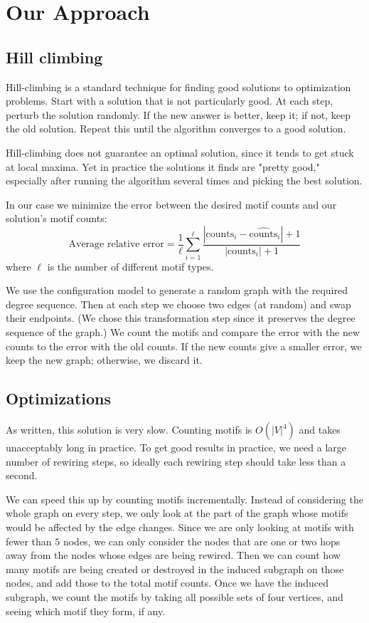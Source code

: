 \section{Our Approach}
\label{sec:approach}

\subsection{Hill climbing}
Hill-climbing is a standard technique for finding good solutions to optimization problems.  Start with a solution that is not particularly good.  At each step, perturb the solution randomly.  If the new answer is better, keep it; if not, keep the old solution.  Repeat this until the algorithm converges to a good solution.

Hill-climbing does not guarantee an optimal solution, since it tends to get stuck at local maxima.  Yet in practice the solutions it finds are "pretty good," especially after running the algorithm several times and picking the best solution.

In our case we minimize the error between the desired motif counts and our solution's motif counts: $$\mbox{Average relative error} = \frac{1}{\ell} \sum_{i = 1}^{\ell} \frac{|\mbox{counts}_i - \widehat{\mbox{counts}}_i| + 1}{|\mbox{counts}_i| + 1}$$ where $\ell$ is the number of different motif types.

We use the configuration model to generate a random graph with the required degree sequence.  Then at each step we choose two edges (at random) and swap their endpoints.  (We chose this transformation step since it preserves the degree sequence of the graph.)  We count the motifs and compare the error with the new counts to the error with the old counts.  If the new counts give a smaller error, we keep the new graph; otherwise, we discard it.

\subsection{Optimizations}
As written, this solution is very slow.  Counting motifs is $O(|V|^4)$ and takes unacceptably long in practice.  To get good results in practice, we need a large number of rewiring steps, so ideally each rewiring step should take less than a second.

We can speed this up by counting motifs incrementally.  Instead of considering the whole graph on every step, we only look at the part of the graph whose motifs would be affected by the edge changes.  Since we are only looking at motifs with fewer than $5$ nodes, we can only consider the nodes that are one or two hops away from the nodes whose edges are being rewired.  Then we can count how many motifs are being created or destroyed in the induced subgraph on those nodes, and add those to the total motif counts.  Once we have the induced subgraph, we count the motifs by taking all possible sets of four vertices, and seeing which motif they form, if any.

